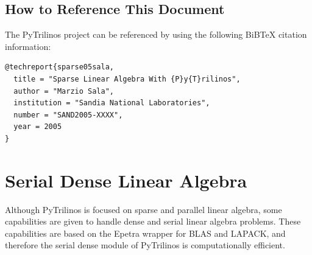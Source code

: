 \documentclass[10pt,relax]{SANDreport}
\begin{document}
\subsection{How to Reference This Document}
\label{sec:reference}

The PyTrilinos project can be referenced by using the following BiBTeX
citation information: 
\begin{verbatim}
@techreport{sparse05sala,
  title = "Sparse Linear Algebra With {P}y{T}rilinos",
  author = "Marzio Sala",
  institution = "Sandia National Laboratories",
  number = "SAND2005-XXXX",
  year = 2005
}
\end{verbatim}

\section{Serial Dense Linear Algebra}
\label{sec:serialdense}

Although PyTrilinos is focused on sparse and parallel linear algebra, some
capabilities are given to handle dense and serial linear algebra problems.
These capabilities are based on the Epetra wrapper for BLAS and LAPACK, and
therefore the serial dense module of PyTrilinos is computationally efficient.
\end{document}
